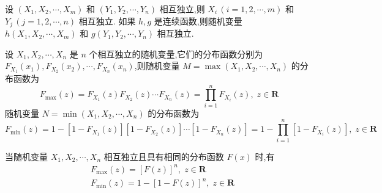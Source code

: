 \begin{conclusion}
    设 $(X_1,X_2,\cdots,X_m)$ 和 $(Y_1,Y_2,\cdots,Y_n)$ 相互独立,则 $X_i \, (i=1,2,\cdots,m)$ 和 $Y_j \, (j=1,2,\cdots,n)$ 相互独立. 如果 $h,g$ 是连续函数,则随机变量 $h(X_1,X_2,\cdots,X_m)$ 和 $g(Y_1,Y_2,\cdots,Y_n)$ 相互独立.
\end{conclusion}

\begin{conclusion}
    设 $X_1,X_2,\cdots,X_n$ 是 $n$ 个相互独立的随机变量,它们的分布函数分别为 $F_{X_1}(x_1), F_{X_2}(x_2), \cdots, F_{X_n}(x_n)$,则随机变量 $M = \max(X_1,X_2,\cdots,X_n)$ 的分布函数为
    $$
    F_{\text{max}}(z) = F_{X_1}(z) F_{X_2}(z) \cdots F_{X_n}(z) = \prod_{i=1}^n F_{X_i}(z), \; z \in \mathbf{R}
    $$
    随机变量 $N = \min(X_1,X_2,\cdots,X_n)$ 的分布函数为
    $$
    F_{\text{min}}(z) = 1-[1-F_{X_1}(z)][1-F_{X_2}(z)] \cdots [1-F_{X_n}(z)] = 1-\prod_{i=1}^n [1-F_{X_i}(z)], \; z \in \mathbf{R}
    $$

    当随机变量 $X_1,X_2,\cdots,X_n$ 相互独立且具有相同的分布函数 $F(x)$ 时,有
    $$
    \begin{aligned}
        & F_{\text{max}}(z) = [F(z)]^n, \; z \in \mathbf{R} \\
        & F_{\text{min}}(z) = 1-[1-F(z)]^n, \; z \in \mathbf{R}
    \end{aligned}
    $$
\end{conclusion}